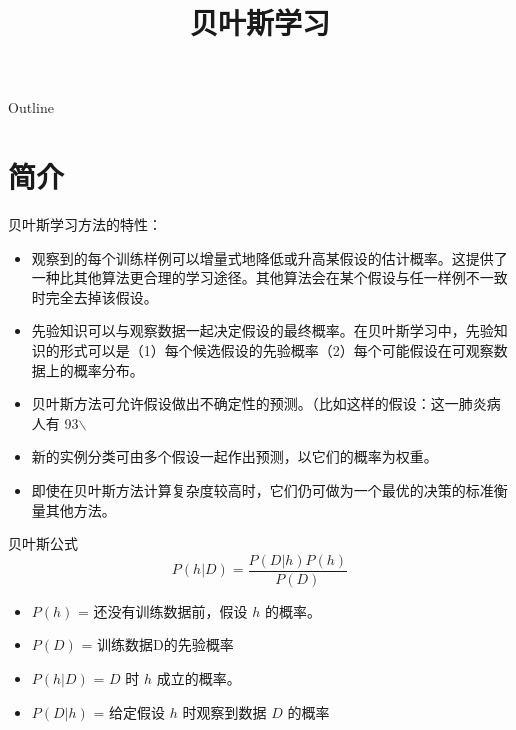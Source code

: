\documentclass[presentation]{beamer}
\date{}
\title{贝叶斯学习}
\begin{document}
\maketitle
\begin{frame}{Outline}
\tableofcontents
\end{frame}







\section{简介}
\label{sec:orgef40548}

\begin{frame}[label={sec:org8cc6793}]{贝叶斯学习方法的特性：}
\begin{itemize}
\item 观察到的每个训练样例可以增量式地降低或升高某假设的估计概率。这提供了一种比其他算法更合理的学习途径。其他算法会在某个假设与任一样例不一致时完全去掉该假设。
\item 先验知识可以与观察数据一起决定假设的最终概率。在贝叶斯学习中，先验知识的形式可以是（1）每个候选假设的先验概率（2）每个可能假设在可观察数据上的概率分布。
\item 贝叶斯方法可允许假设做出不确定性的预测。（比如这样的假设：这一肺炎病人有 93$\backslash$%
\item 新的实例分类可由多个假设一起作出预测，以它们的概率为权重。
\item 即使在贝叶斯方法计算复杂度较高时，它们仍可做为一个最优的决策的标准衡量其他方法。
\end{itemize}
\end{frame}

\begin{frame}[label={sec:org961cb87}]{贝叶斯公式}
\[ P(h|D) = \frac{P(D|h) P(h)}{P(D)} \]


\begin{itemize}
\item \(P(h)\) = 还没有训练数据前，假设 \(h\) 的概率。
\item \(P(D)\) = 训练数据D的先验概率
\item \(P(h|D)\) = \(D\) 时 \(h\) 成立的概率。
\item \(P(D|h)\) = 给定假设 \(h\) 时观察到数据 \(D\) 的概率
\end{itemize}
\end{frame}
\end{document}
